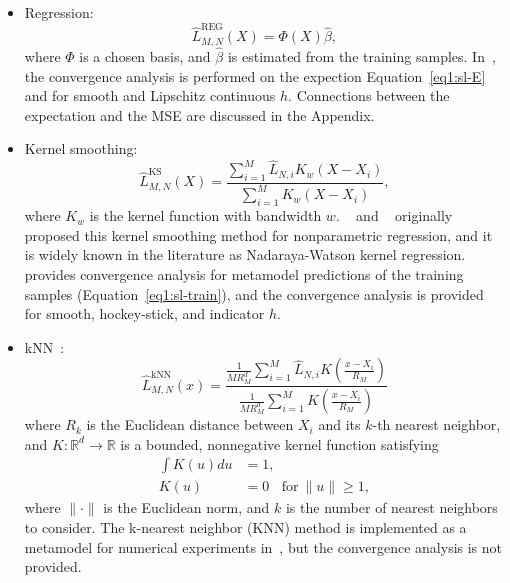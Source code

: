 \begin{itemize}
    \item   Regression:
            $$\hat{L}^{\text{REG}}_{M, N}(X) = \Phi(X) \hat{\beta},$$
            where $\Phi$ is a chosen basis, and $\hat{\beta}$ is estimated from the training samples.
            In~\cite{broadie2015risk}, the convergence analysis is performed on the expection Equation~\ref{eq1:sl-E} and for smooth and Lipschitz continuous $h$. 
            Connections between the expectation and the MSE are discussed in the Appendix.
    \item   Kernel smoothing:
            $$\hat{L}^{\text{KS}}_{M, N}(X) = \frac{\sum_{i=1}^M \hat{L}_{N, i} K_w(X - X_i)}{\sum_{i=1}^M K_w(X - X_i)}, $$
            where $K_w$ is the kernel function with bandwidth $w$.
            ~\cite{nadaraya1964estimating} and ~\cite{watson1964smooth} originally proposed this kernel smoothing method for nonparametric regression, and it is widely known in the literature as Nadaraya-Watson kernel regression.
            ~\cite{hong2017kernel} provides convergence analysis for metamodel predictions of the training samples (Equation~\ref{eq1:sl-train}), and the convergence analysis is provided for smooth, hockey-stick, and indicator $h$. 

    \item   kNN~\citep{mack1981local}:
            \begin{equation*}
            \hat{L}^{\text{kNN}}_{M, N}(x) 
            = \frac{\frac{1}{M R_M^d} \sum_{i=1}^M \hat{L}_{N, i} K\left(\frac{x - X_i}{R_M}\right)}{\frac{1}{M R_M^d} \sum_{i=1}^M K\left(\frac{x - X_i}{R_M}\right)}
            \end{equation*}
            where $R_k$ is the Euclidean distance between $X_i$ and its $k$-th nearest neighbor, and $K:\mathbb{R}^d \rightarrow \mathbb{R}$ is a bounded, nonnegative kernel function satisfying 
            \begin{align*}
                \int K(u) du & = 1, \\
                K(u) &= 0 ~~~ ~\text{for}~ \|u\| \geq 1,
            \end{align*}
            where $\|\cdot\|$ is the Euclidean norm, and  $k$ is the number of nearest neighbors to consider.
            The k-nearest neighbor (KNN) method is implemented as a metamodel for numerical experiments in~\cite{hong2017kernel}, but the convergence analysis is not provided.


\end{itemize}
